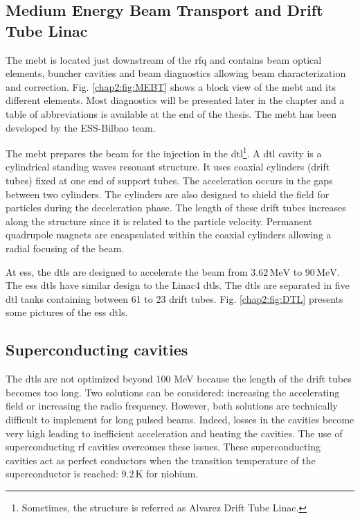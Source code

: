 \begin{refsection}
  \subsection{Medium Energy Beam Transport and Drift Tube Linac}
  The \acrfull{mebt} is located just downstream of the \acrshort{rfq} and contains beam optical elements, buncher cavities and beam diagnostics allowing beam characterization and correction. Fig. \ref{chap2:fig:MEBT} shows a block view of the \acrshort{mebt} and its different elements. Most diagnostics will be presented later in the chapter and a table of abbreviations is available at the end of the thesis. The \acrshort{mebt} has been developed by the ESS-Bilbao team.
  

  
  The \acrshort{mebt} prepares the beam for the injection in the \acrfull{dtl}\footnote{Sometimes, the structure is referred as Alvarez Drift Tube Linac.}.
  A \acrshort{dtl} cavity is a cylindrical standing waves resonant structure. It uses coaxial cylinders (drift tubes) fixed at one end of support tubes. The acceleration occurs in the gaps between two cylinders. The cylinders are also designed to shield the field for particles during the deceleration phase. The length of these drift tubes increases along the structure since it is related to the particle velocity. Permanent quadrupole magnets are encapsulated within the coaxial cylinders allowing a radial focusing of the beam.

  At \acrshort{ess}, the \acrshort{dtl}s are designed to accelerate the beam from $3.62\,\mathrm{MeV}$ to $90\,\mathrm{MeV}$. The \acrshort{ess} \acrshort{dtl}s have similar design to the Linac4 \acrshort{dtl}s. The \acrshort{dtl}s are separated in five \acrshort{dtl} tanks containing between 61 to 23 drift tubes. Fig. \ref{chap2:fig:DTL} presents some pictures of the \acrshort{ess} \acrshort{dtl}s.


  \subsection{Superconducting cavities}
  The \acrshort{dtl}s are not optimized beyond 100 MeV because the length of the drift tubes becomes too long. Two solutions can be considered: increasing the accelerating field or increasing the radio frequency. However, both solutions are technically difficult to implement for long pulsed beams. Indeed, losses in the cavities become very high leading to inefficient acceleration and heating the cavities. The use of superconducting \acrshort{rf} cavities overcomes these issues. These superconducting cavities act as perfect conductors when the transition temperature of the superconductor is reached: $9.2\,\mathrm{K}$ for niobium.


\end{refsection}
